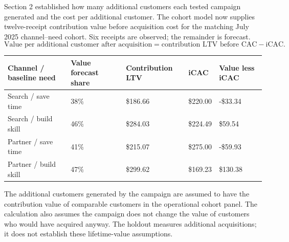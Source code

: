 \documentclass[10pt]{article}
\begin{document}
Section 2 established how many additional customers each tested campaign generated and the cost per additional customer. The cohort model now supplies twelve-receipt contribution value before acquisition cost for the matching July 2025 channel--need cohort. Six receipts are observed; the remainder is forecast.
\[
\text{Value per additional customer after acquisition}
=\text{contribution LTV before CAC}-\mathrm{iCAC}.
\]
{\fontsize{8.5}{10.5}\selectfont \par\begin{tabularx}{\linewidth}{@{}p{.26\linewidth}YYYY@{}}\toprule
\textbf{Channel / baseline need} & \textbf{Value forecast share} & \textbf{Contribution LTV} & \textbf{iCAC} & \textbf{Value less iCAC}\\\midrule
Search / save time & 38\% & \$186.66 & \$220.00 & -\$33.34\\
Search / build skill & 46\% & \$284.03 & \$224.49 & \$59.54\\
Partner / save time & 41\% & \$215.07 & \$275.00 & -\$59.93\\
Partner / build skill & 47\% & \$299.62 & \$169.23 & \$130.38\\
\bottomrule\end{tabularx}\par}
The additional customers generated by the campaign are assumed to have the contribution value of comparable customers in the operational cohort panel. The calculation also assumes the campaign does not change the value of customers who would have acquired anyway. The holdout measures additional acquisitions; it does not establish these lifetime-value assumptions.
\end{document}
